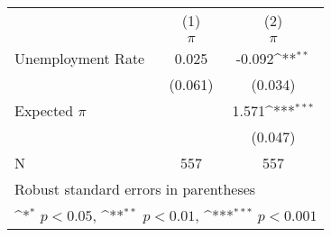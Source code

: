 {
\def\sym#1{\ifmmode^{#1}\else\(^{#1}\)\fi}
\begin{tabular}{l*{2}{c}}
\toprule
                    &\multicolumn{1}{c}{(1)}&\multicolumn{1}{c}{(2)}\\
                    &\multicolumn{1}{c}{$\pi$}&\multicolumn{1}{c}{$\pi$}\\
\midrule
Unemployment Rate   &   \textcolor{mycolor2}{    0.025}         &   \textcolor{mycolor5}{   -0.092}\sym{**} \\
                    &     (0.061)         &     (0.034)         \\
\addlinespace
Expected $\pi$      &                     &       1.571\sym{***}\\
                    &                     &     (0.047)         \\
\midrule
N                   &         557         &         557         \\
\bottomrule
\multicolumn{3}{l}{\footnotesize Robust standard errors in parentheses}\\
\multicolumn{3}{l}{\footnotesize \sym{*} \(p<0.05\), \sym{**} \(p<0.01\), \sym{***} \(p<0.001\)}\\
\end{tabular}
}
